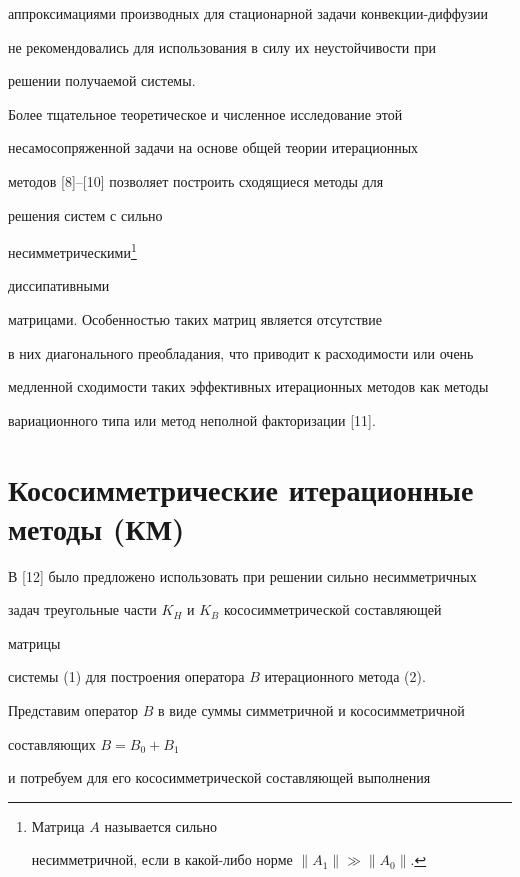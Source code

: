 аппроксимациями производных для стационарной задачи конвекции-диффузии 


не рекомендовались для использования в силу их неустойчивости при 


решении получаемой системы. 


 


Более тщательное теоретическое и численное исследование этой 


несамосопряженной задачи на основе общей теории итерационных 


методов [8]--[10] позволяет построить сходящиеся методы для 


решения систем с сильно 


несимметрическими\footnote{Матрица $A$ называется сильно 


несимметричной, если в какой-либо норме $\|A_1\|\gg\|A_0\|$.} 


диссипативными 


матрицами. Особенностью таких матриц является отсутствие 


в них диагонального преобладания, что приводит к расходимости или очень 


медленной сходимости таких эффективных итерационных методов как методы 


вариационного типа или метод неполной факторизации [11]. 


 


\section{Кососимметрические итерационные методы (КМ)} 


 


В [12] было предложено использовать при решении сильно несимметричных 


задач треугольные части $K_H$ и $K_B$ кососимметрической составляющей 


матрицы 


системы (1) для построения оператора $B$ итерационного метода (2). 


 


Представим оператор $B$ в виде суммы симметричной и кососимметричной 


составляющих $B=B_0+B_1$ 


и потребуем для его кососимметрической составляющей выполнения 


